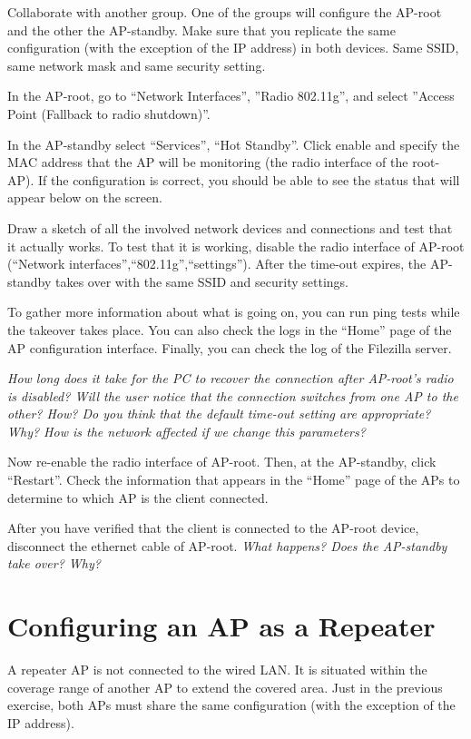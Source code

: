 Collaborate with another group.
One of the groups will configure the AP-root and the other the AP-standby.
Make sure that you replicate the same configuration (with the exception of the IP address) in both devices.
Same SSID, same network mask and same security setting.

In the AP-root, go to ``Network Interfaces'', ''Radio 802.11g'', and select ''Access Point (Fallback to radio shutdown)''.

In the AP-standby select ``Services'', ``Hot Standby''.
Click enable and specify the MAC address that the AP will be monitoring (the radio interface of the root-AP).
If the configuration is correct, you should be able to see the status that will appear below on the screen.

Draw a sketch of all the involved network devices and connections and test that it actually works.
To test that it is working, disable the radio interface of AP-root (``Network interfaces'',``802.11g'',``settings'').
After the time-out expires, the AP-standby takes over with the same SSID and security settings.

To gather more information about what is going on, you can run ping tests while the takeover takes place.
You can also check the logs in the ``Home'' page of the AP configuration interface.
Finally, you can check the log of the Filezilla server.

\emph{How long does it take for the PC to recover the connection after AP-root's radio is disabled?
Will the user notice that the connection switches from one AP to the other? How?
Do you think that the default time-out setting are appropriate? Why?
How is the network affected if we change this parameters?
}

Now re-enable the radio interface of AP-root.
Then, at the AP-standby, click ``Restart''.
Check the information that appears in the ``Home'' page of the APs to determine to which AP is the client connected.

After you have verified that the client is connected to the AP-root device, disconnect the ethernet cable of AP-root.
\emph{What happens? Does the AP-standby take over? Why?}

\section{Configuring an AP as a Repeater}

A repeater AP is not connected to the wired LAN.
It is situated within the coverage range of another AP to extend the covered area.
Just in the previous exercise, both APs must share the same configuration (with the exception of the IP address).


